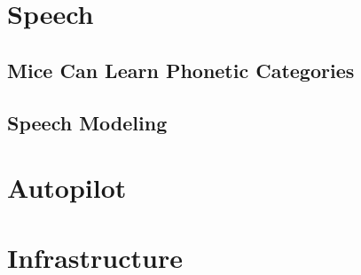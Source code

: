 
\tableofcontents%
%

\part{Speech}

\chapter{Mice Can Learn Phonetic Categories}



\chapter{Speech Modeling}



\part{Autopilot}



\part{Infrastructure}

\begin{fullwidth}



\end{fullwidth}